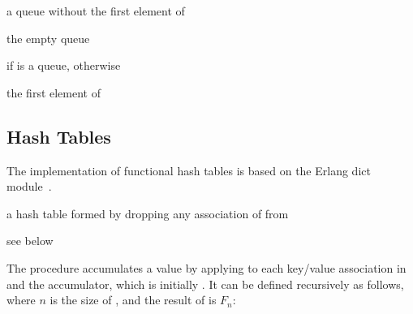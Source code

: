 \begin{procedure}
\end{procedure}
\returns{} a queue without the first element of 

\begin{syntax}
\end{syntax}
\returns{} the empty queue

\begin{procedure}
\end{procedure}
\returns{}  if  is a queue,  otherwise

\begin{procedure}
\end{procedure}
\returns{} the first element of 

\subsection{Hash Tables}

The implementation of functional hash tables is based on the Erlang
dict module~\cite{dict-ref,dynamic-hashing}.

\begin{procedure}
\end{procedure}
\returns{} a hash table formed by dropping any association of
 from 

\begin{procedure}
\end{procedure}
\returns{} see below

The  procedure accumulates a value by applying 
to each key/value association in  and the accumulator, which
is initially . It can be defined recursively as follows,
where $n$ is the size of , and the result of 
is $F_n$:

